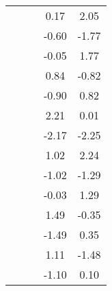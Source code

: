 \begin{table}
\begin{tabular}{c|cc|cc|}
\multicolumn{1}{|c|}{} & \multicolumn{1}{|c|}{} & \multicolumn{1}{|c|}{} & \multicolumn{1}{|c|}{      0.17} & \multicolumn{1}{|c|}{      2.05} \\ 
\multicolumn{1}{|c|}{} & \multicolumn{1}{|c|}{} & \multicolumn{1}{|c|}{} & \multicolumn{1}{|c|}{     -0.60} & \multicolumn{1}{|c|}{     -1.77} \\ 
\multicolumn{1}{|c|}{} & \multicolumn{1}{|c|}{} & \multicolumn{1}{|c|}{} & \multicolumn{1}{|c|}{     -0.05} & \multicolumn{1}{|c|}{      1.77} \\ 
\multicolumn{1}{|c|}{} & \multicolumn{1}{|c|}{} & \multicolumn{1}{|c|}{} & \multicolumn{1}{|c|}{      0.84} & \multicolumn{1}{|c|}{     -0.82} \\ 
\multicolumn{1}{|c|}{} & \multicolumn{1}{|c|}{} & \multicolumn{1}{|c|}{} & \multicolumn{1}{|c|}{     -0.90} & \multicolumn{1}{|c|}{      0.82} \\ 
\multicolumn{1}{|c|}{} & \multicolumn{1}{|c|}{} & \multicolumn{1}{|c|}{} & \multicolumn{1}{|c|}{      2.21} & \multicolumn{1}{|c|}{      0.01} \\ 
\multicolumn{1}{|c|}{} & \multicolumn{1}{|c|}{} & \multicolumn{1}{|c|}{} & \multicolumn{1}{|c|}{     -2.17} & \multicolumn{1}{|c|}{     -2.25} \\ 
\multicolumn{1}{|c|}{} & \multicolumn{1}{|c|}{} & \multicolumn{1}{|c|}{} & \multicolumn{1}{|c|}{      1.02} & \multicolumn{1}{|c|}{      2.24} \\ 
\multicolumn{1}{|c|}{} & \multicolumn{1}{|c|}{} & \multicolumn{1}{|c|}{} & \multicolumn{1}{|c|}{     -1.02} & \multicolumn{1}{|c|}{     -1.29} \\ 
\multicolumn{1}{|c|}{} & \multicolumn{1}{|c|}{} & \multicolumn{1}{|c|}{} & \multicolumn{1}{|c|}{     -0.03} & \multicolumn{1}{|c|}{      1.29} \\ 
\multicolumn{1}{|c|}{} & \multicolumn{1}{|c|}{} & \multicolumn{1}{|c|}{} & \multicolumn{1}{|c|}{      1.49} & \multicolumn{1}{|c|}{     -0.35} \\ 
\multicolumn{1}{|c|}{} & \multicolumn{1}{|c|}{} & \multicolumn{1}{|c|}{} & \multicolumn{1}{|c|}{     -1.49} & \multicolumn{1}{|c|}{      0.35} \\ 
\multicolumn{1}{|c|}{} & \multicolumn{1}{|c|}{} & \multicolumn{1}{|c|}{} & \multicolumn{1}{|c|}{      1.11} & \multicolumn{1}{|c|}{     -1.48} \\ 
\multicolumn{1}{|c|}{} & \multicolumn{1}{|c|}{} & \multicolumn{1}{|c|}{} & \multicolumn{1}{|c|}{     -1.10} & \multicolumn{1}{|c|}{      0.10} \\ 

\end{tabular}
\end{table}
